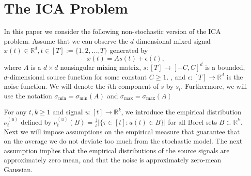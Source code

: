 \documentclass{article}
\newcommand{\real}{\mathbb{R}}
\newcommand{\R}{\real}
\newcommand{\iid}{i.i.d.\xspace}
\theoremstyle{definition}
\begin{document}
\section{The ICA Problem}
\label{sec:Preliminaries}
In this paper we consider the following non-stochastic version of the ICA problem.
Assume that we can observe the $d$ dimensional mixed signal $x(t) \in \R^d, t \in [T]:=\{1,2,\ldots,T\}$ generated by  
\begin{equation}
\label{eq:ICA}
x(t) = As(t)+\epsilon(t), 
\end{equation}
where $A$ is a $d\times d$ nonsingular mixing matrix,  $s:[T] \to [-C,C]^d$ is a bounded, $d$-dimensional source function for some constant $C \ge 1$. , and $\epsilon:[T] \to \R^d$ is the noise function. We will denote the $i$th component of $s$ by $s_i$. Furthermore, we will use the notation $\sigma_{\min}=\sigma_{\min}(A)$ and
$\sigma_{\max}=\sigma_{\max}(A)$

For any $t,k \ge 1$ and signal $u:[t] \to \R^k$, we introduce the empirical distribution $\nu_t^{(u)}$ defined by
$\nu_t^{(u)}(B)=\tfrac{1}{t}|\{\tau \in [t]: u(t) \in B\}|$ for all Borel sets $B \subset \R^k$. Next we will impose assumptions on the empirical measure that guarantee that on the average we do not deviate too much from the stochastic model. The next assumption implies that the empirical distributions of the source signals are approximately zero mean, and that the noise is approximately zero-mean Gaussian.
\end{document}
